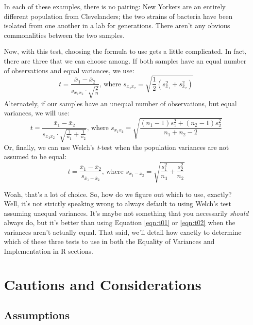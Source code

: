 In each of these examples, there is no pairing: New Yorkers are an entirely different population from Clevelanders; the two strains of bacteria have been isolated from one another in a lab for generations. There aren't any obvious commonalities between the two samples.

Now, with this test, choosing the formula to use gets a little complicated. In fact, there are three that we can choose among. If both samples have an equal number of observations and equal variances, we use:
\begin{equation}
t = \frac{\bar {x}_1 - \bar{x}_2}{s_{x_1x_2} \cdot \sqrt{\frac{2}{n}}}\text{, where }s_{x_1x_2} = \sqrt{\frac{1}{2}(s_{x_1}^2+s_{x_2}^2)}
\label{eqn:t01}
\end{equation}
Alternately, if our samples have an unequal number of observations, but equal variances, we will use:
\begin{equation}
t = \frac{\bar {x}_1 - \bar{x}_2}{s_{x_1x_2} \cdot \sqrt{\frac{1}{n_1}+\frac{1}{n_2}}}\text{, where }s_{x_1x_2} = \sqrt{\frac{(n_1-1)s_{1}^2+(n_2-1)s_{2}^2}{n_1+n_2-2}}
\label{eqn:t02}
\end{equation}
Or, finally, we can use Welch's \textit{t}-test when the population variances are not assumed to be equal:
\begin{equation}
t = {\frac{\bar{x}_1 - \bar{x}_2}{s_{\bar{x}_1 - \bar{x}_2}}}\text{, where }s_{\bar{x}_1 - \bar{x}_2} = \sqrt{\frac{s_1^2}{n_1} + \frac{s_2^2}{n_2}}
\label{eqn:t03}
\end{equation}

Woah, that's a lot of choice. So, how do we figure out which to use, exactly? Well, it's not strictly speaking wrong to always default to using Welch's test  assuming unequal variances. It's maybe not something that you necessarily \textit{should} always do, but it's better than using Equation \ref{eqn:t01} or \ref{eqn:t02} when the variances aren't actually equal. That said, we'll detail how exactly to determine which of these three tests to use in both the Equality of Variances and Implementation in R sections.

\section{Cautions and Considerations}

\subsection{Assumptions}

